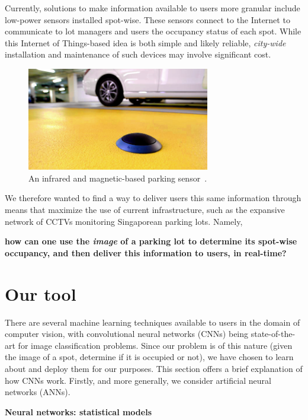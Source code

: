 \documentclass[a4paper, 11pt]{article} %
\begin{document}
    Currently, solutions to make information available to users more granular include low-power sensors 
    installed spot-wise. These sensors connect to the Internet to communicate to lot managers and 
    users the occupancy status of each spot. While this Internet of Things-based idea is both simple 
    and likely reliable, \textit{city-wide} installation and maintenance of such devices may involve 
    significant cost.
    \vskip 5mm
    \begin{figure}[h]
    	\centering
    	\includegraphics[width=8cm]{figures/sensor.jpg}
    	\caption{An infrared and magnetic-based parking sensor~\cite{parking-sensors}\relax.}
    \end{figure}
    We therefore wanted to find a way to deliver users this same information through means that 
    maximize the use of current infrastructure, such as the expansive network of CCTVs monitoring 
    Singaporean parking lots. Namely,
    \vskip 1mm
    \begin{center}
        \textbf{
        how can one use the \textit{image} of a parking lot to determine its spot-wise occupancy, and then deliver this information to users, in real-time?
        }
    \end{center}

\section{Our tool}
    There are several machine learning techniques available to users in the domain of computer vision, 
    with convolutional neural networks (CNNs) being state-of-the-art for image classification problems. 
    Since our problem is of this nature (given the image of a spot, determine if it is occupied or not), we 
    have chosen to learn about and deploy them for our purposes. This section offers a brief 
    explanation of how CNNs work. Firstly, and more generally, we consider artificial neural networks 
    (ANNs).
    
    \hspace*{-6mm}\textbf{Neural networks: statistical models}
    
\end{document}
